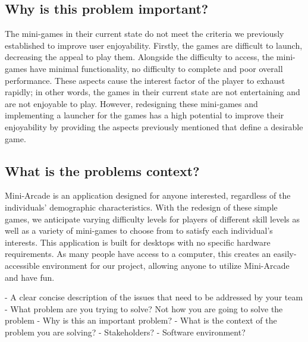 \documentclass{article}
\begin{document}
\subsection{Why is this problem important?}
The mini-games in their current state do not meet the criteria we previously established to improve user enjoyability. Firstly, the games are difficult to launch, decreasing the appeal to play them. Alongside the difficulty to access, the mini-games have minimal functionality, no difficulty to complete and poor overall performance. These aspects cause the interest factor of the player to exhaust rapidly; in other words, the games in their current state are not entertaining and are not enjoyable to play. However, redesigning these mini-games and implementing a launcher for the games has a high potential to improve their enjoyability by providing the aspects previously mentioned that define a desirable game.

\subsection{What is the problems context?}
Mini-Arcade is an application designed for anyone interested, regardless of the individuals' demographic characteristics. With the redesign of these simple games, we anticipate varying difficulty levels for players of different skill levels as well as a variety of mini-games to choose from to satisfy each individual's interests. This application is built for desktops with no specific hardware requirements. As many people have access to a computer, this creates an easily-accessible environment for our project, allowing anyone to utilize Mini-Arcade and have fun.

- A clear concise description of the issues that need to be addressed by your team
- What problem are you trying to solve? Not how you are going to solve the problem
- Why is this an important problem?
- What is the context of the problem you are solving?
	- Stakeholders?
	- Software environment?
	





\end{document}
